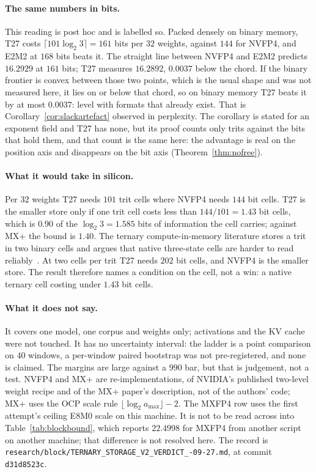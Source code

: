 \paragraph{The same numbers in bits.} This reading is post hoc and is labelled
so. Packed densely on binary memory, T27 costs $\lceil 101\log_2 3\rceil=161$ bits per $32$
weights, against $144$ for NVFP4, and E2M2 at $168$ bits beats it. The straight line between
NVFP4 and E2M2 predicts $16.2929$ at $161$ bits; T27 measures $16.2892$, $0.0037$ below the
chord. If the binary frontier is convex between those two points, which is the usual shape and
was not measured here, it lies on or below that chord, so on binary memory T27 beats it by at
most $0.0037$: level with formats that already exist. That is Corollary~\ref{cor:slackartefact}
observed in perplexity. The corollary is stated for an exponent field and T27 has none, but its
proof counts only trits against the bits that hold them, and that count is the same here: the
advantage is real on the position axis and disappears on the bit axis (Theorem~\ref{thm:nofree}).

\paragraph{What it would take in silicon.} Per $32$ weights T27 needs $101$ trit
cells where NVFP4 needs $144$ bit cells. T27 is the smaller store only if one
trit cell costs less than $144/101=1.43$ bit cells, which is $0.90$ of the
$\log_2 3=1.585$ bits of information the cell carries; against MX+ the bound is
$1.40$. The ternary compute-in-memory literature stores a trit in two binary
cells and argues that native three-state cells are harder to read
reliably~\cite{retern}. At two cells per trit T27 needs $202$ bit cells, and
NVFP4 is the smaller store. The result therefore names a condition on the cell,
not a win: a native ternary cell costing under $1.43$ bit cells.

\paragraph{What it does not say.} It covers one model, one corpus and weights
only; activations and the KV cache were not touched. It has no uncertainty
interval: the ladder is a point comparison on $40$ windows, a per-window paired
bootstrap was not pre-registered, and none is claimed. The margins are large
against a $990$ bar, but that is judgement, not a test. NVFP4 and MX+ are
re-implementations, of NVIDIA's published two-level weight recipe and of the
MX+ paper's description, not of the authors' code; MX+ uses the OCP scale rule
$\lfloor\log_2 a_{\max}\rfloor-2$. The MXFP4 row uses the first attempt's
ceiling E8M0 scale on this machine. It is not to be read across into
Table~\ref{tab:blockbound}, which reports $22.4998$ for MXFP4 from another
script on another machine; that difference is not resolved here. The record
is \texttt{research/\allowbreak block/\allowbreak TERNARY\_\allowbreak STORAGE\_\allowbreak V2\_\allowbreak VERDICT\_-09-27.md}, at
commit \texttt{d31d8523c}.


